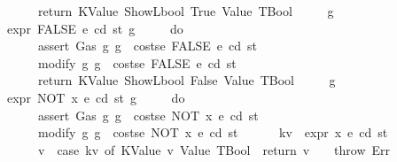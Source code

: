 \begin{isabellebody}
\ \ \ \ \ \ return\ {\isacharparenleft}{\kern0pt}KValue\ {\isacharparenleft}{\kern0pt}ShowL\isactrlsub b\isactrlsub o\isactrlsub o\isactrlsub l\ True{\isacharparenright}{\kern0pt}{\isacharcomma}{\kern0pt}\ Value\ TBool{\isacharparenright}{\kern0pt}\isanewline
\ \ \ \ {\isacharbraceright}{\kern0pt}{\isacharparenright}{\kern0pt}\ g{\isachardoublequoteclose}\isanewline
{\isacharbar}{\kern0pt}\ {\isachardoublequoteopen}expr\ FALSE\ e\ cd\ st\ g\ {\isacharequal}{\kern0pt}\isanewline
\ \ \ \ {\isacharparenleft}{\kern0pt}do\ {\isacharbraceleft}{\kern0pt}\isanewline
\ \ \ \ \ \ assert\ Gas\ {\isacharparenleft}{\kern0pt}{\isasymlambda}g{\isachardot}{\kern0pt}\ g\ {\isachargreater}{\kern0pt}\ costs\isactrlsub e\ FALSE\ e\ cd\ st{\isacharparenright}{\kern0pt}{\isacharsemicolon}{\kern0pt}\isanewline
\ \ \ \ \ \ modify\ {\isacharparenleft}{\kern0pt}{\isasymlambda}g{\isachardot}{\kern0pt}\ g\ {\isacharminus}{\kern0pt}\ costs\isactrlsub e\ FALSE\ e\ cd\ st{\isacharparenright}{\kern0pt}{\isacharsemicolon}{\kern0pt}\isanewline
\ \ \ \ \ \ return\ {\isacharparenleft}{\kern0pt}KValue\ {\isacharparenleft}{\kern0pt}ShowL\isactrlsub b\isactrlsub o\isactrlsub o\isactrlsub l\ False{\isacharparenright}{\kern0pt}{\isacharcomma}{\kern0pt}\ Value\ TBool{\isacharparenright}{\kern0pt}\isanewline
\ \ \ \ {\isacharbraceright}{\kern0pt}{\isacharparenright}{\kern0pt}\ g{\isachardoublequoteclose}\isanewline
{\isacharbar}{\kern0pt}\ {\isachardoublequoteopen}expr\ {\isacharparenleft}{\kern0pt}NOT\ x{\isacharparenright}{\kern0pt}\ e\ cd\ st\ g\ {\isacharequal}{\kern0pt}\isanewline
\ \ \ \ {\isacharparenleft}{\kern0pt}do\ {\isacharbraceleft}{\kern0pt}\isanewline
\ \ \ \ \ \ assert\ Gas\ {\isacharparenleft}{\kern0pt}{\isasymlambda}g{\isachardot}{\kern0pt}\ g\ {\isachargreater}{\kern0pt}\ costs\isactrlsub e\ {\isacharparenleft}{\kern0pt}NOT\ x{\isacharparenright}{\kern0pt}\ e\ cd\ st{\isacharparenright}{\kern0pt}{\isacharsemicolon}{\kern0pt}\isanewline
\ \ \ \ \ \ modify\ {\isacharparenleft}{\kern0pt}{\isasymlambda}g{\isachardot}{\kern0pt}\ g\ {\isacharminus}{\kern0pt}\ costs\isactrlsub e\ {\isacharparenleft}{\kern0pt}NOT\ x{\isacharparenright}{\kern0pt}\ e\ cd\ st{\isacharparenright}{\kern0pt}{\isacharsemicolon}{\kern0pt}\isanewline
\ \ \ \ \ \ kv\ {\isasymleftarrow}\ expr\ x\ e\ cd\ st{\isacharsemicolon}{\kern0pt}\isanewline
\ \ \ \ \ \ v\ {\isasymleftarrow}\ case\ kv\ of\ {\isacharparenleft}{\kern0pt}KValue\ v{\isacharcomma}{\kern0pt}\ Value\ TBool{\isacharparenright}{\kern0pt}\ {\isasymRightarrow}\ return\ v\ {\isacharbar}{\kern0pt}\ {\isacharunderscore}{\kern0pt}\ {\isasymRightarrow}\ throw\ Err{\isacharsemicolon}{\kern0pt}\isanewline

\end{isabellebody}
